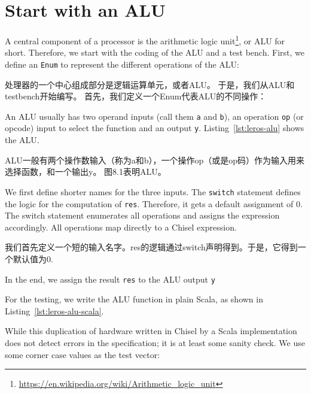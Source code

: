 \documentclass[%
    10pt,
    headinclude, footexclude,
    openright, %
    notitlepage,
    cleardoubleempty,
    headsepline,
    pointlessnumbers,
    bibtotoc, idxtotoc,
    ]{scrbook}
\newcommand{\code}[1]{{\small{\texttt{#1}}}}
\newcommand{\todo}[1]{{\emph{TODO: #1}}}
\newcommand{\myref}[2]{\href{#1}{#2}}
\renewcommand{\myref}[2]{{#2}{\footnote{\url{#1}}}}
\renewcommand{\todo}[1]{}
\begin{document}
\section{Start with an ALU}

A central component of a processor is the
\myref{https://en.wikipedia.org/wiki/Arithmetic_logic_unit}{arithmetic logic unit}, or ALU for short.
Therefore, we start with the coding of the ALU and a test bench.
First, we define an \code{Enum} to represent the different operations of the ALU:

处理器的一个中心组成部分是逻辑运算单元，或者ALU。
于是，我们从ALU和testbench开始编写。
首先，我们定义一个Enum代表ALU的不同操作：


\noindent An ALU usually has two operand inputs (call them \code{a} and \code{b}), an operation \code{op}
(or opcode) input to select the function and an output \code{y}.
Listing~\ref{lst:leros-alu} shows the ALU.

ALU一般有两个操作数输入（称为a和b），一个操作op（或是op码）作为输入用来选择函数，和一个输出y。
图8.1表明ALU。

\todo{draw a nice ALU, see Wikipedia}

We first define shorter names for the three inputs. The \code{switch} statement defines the
logic for the computation of \code{res}. Therefore, it gets a default assignment of 0.
The switch statement enumerates all operations and assigns the expression accordingly.
All operations map directly to a Chisel expression.

我们首先定义一个短的输入名字。res的逻辑通过switch声明得到。于是，它得到一个默认值为0.

In the end, we assign the result \code{res} to the ALU output \code{y}


For the testing, we write the ALU function in plain Scala, as shown in Listing~\ref{lst:leros-alu-scala}.


\noindent While this duplication of hardware written in Chisel by a Scala implementation does not
detect errors in the specification; it is at least some sanity check.
We use some corner case values as the test vector:

\end{document}
